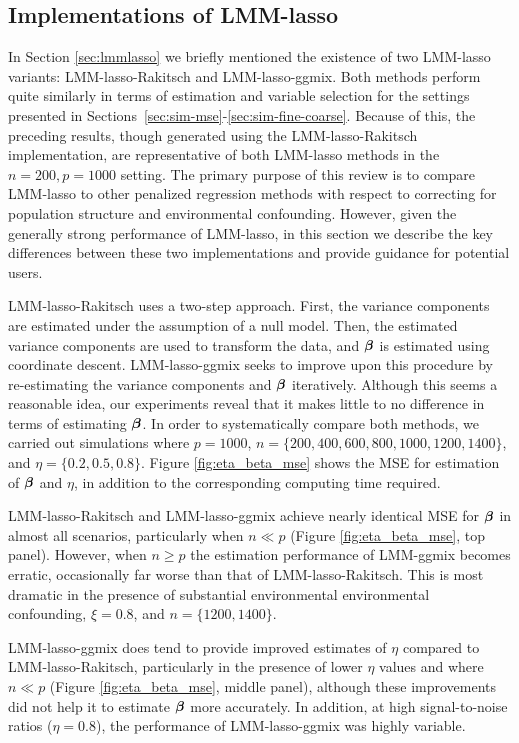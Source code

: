 \subsection{Implementations of LMM-lasso}

In Section \ref{sec:lmmlasso} we briefly mentioned the existence of two LMM-lasso variants: LMM-lasso-Rakitsch and LMM-lasso-ggmix. Both methods perform quite similarly in terms of estimation and variable selection for the settings presented in Sections~\ref{sec:sim-mse}-\ref{sec:sim-fine-coarse}. Because of this, the preceding results, though generated using the LMM-lasso-Rakitsch implementation, are representative of both LMM-lasso methods in the $n = 200, p = 1000$ setting. The primary purpose of this review is to compare LMM-lasso to other penalized regression methods with respect to correcting for population structure and environmental confounding. However, given the generally strong performance of LMM-lasso, in this section we describe the key differences between these two implementations and provide guidance for potential users.

LMM-lasso-Rakitsch uses a two-step approach. First, the variance components are estimated under the assumption of a null model. Then, the estimated variance components are used to transform the data, and $\boldsymbol{\beta}{}$ is estimated using coordinate descent. LMM-lasso-ggmix seeks to improve upon this procedure by re-estimating the variance components and $\boldsymbol{\beta}{}$ iteratively. Although this seems a reasonable idea, our experiments reveal that it makes little to no difference in terms of estimating $\boldsymbol{\beta}{}$. In order to systematically compare both methods, we carried out simulations where $p = 1000$, $n = \{200, 400, 600, 800, 1000, 1200, 1400\}$, and $\eta = \{0.2, 0.5, 0.8\}$. Figure \ref{fig:eta_beta_mse} shows the MSE for estimation of $\boldsymbol{\beta}{}$ and $\eta$, in addition to the corresponding computing time required. 

LMM-lasso-Rakitsch and LMM-lasso-ggmix achieve nearly identical MSE for $\boldsymbol{\beta}{}$ in almost all scenarios, particularly when $n \ll p$ (Figure \ref{fig:eta_beta_mse}, top panel). However, when $n \ge p$ the estimation performance of LMM-ggmix becomes erratic, occasionally far worse than that of LMM-lasso-Rakitsch. This is most dramatic in the presence of substantial environmental environmental confounding, $\xi = 0.8$, and $n = \{1200, 1400\}$. 

LMM-lasso-ggmix does tend to provide improved estimates of $\eta$ compared to LMM-lasso-Rakitsch, particularly in the presence of lower $\eta$ values and where $n \ll p$ (Figure \ref{fig:eta_beta_mse}, middle panel), although these improvements did not help it to estimate $\boldsymbol{\beta}{}$ more accurately. In addition, at high signal-to-noise ratios ($\eta=0.8$), the performance of LMM-lasso-ggmix was highly variable.

